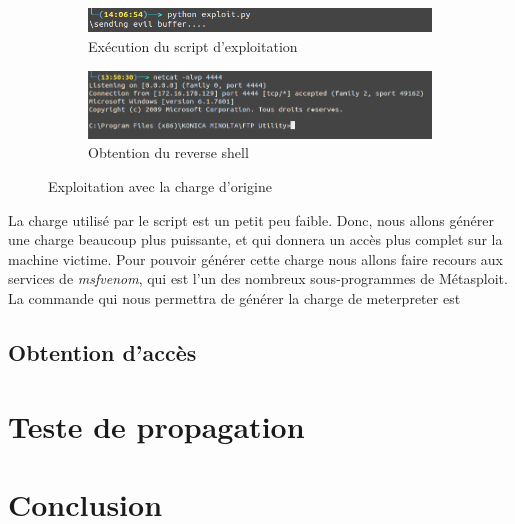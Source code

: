     \begin{figure}[h!]
        \centering
        \begin{subfigure}{0.9\textwidth}
            \centering
            \includegraphics[width=\textwidth]{images/exploit_python.png}
            \caption{Exécution du script d'exploitation}
            \label{execution_script_exploitation}
        \end{subfigure}
        \hfill
        \begin{subfigure}{0.9\textwidth}
            \centering
            \includegraphics[width=\textwidth]{images/reverse_shell.png}
            \caption{Obtention du reverse shell}
            \label{obtention_reverse_shell}
        \end{subfigure}
        \hfill
        \caption{Exploitation avec la charge d'origine}
        \label{exploitation_avec_charge_origine}
    \end{figure}


    La charge utilisé par le script est un petit peu faible. Donc, nous allons générer une charge beaucoup plus
    puissante, et qui donnera un accès plus complet sur la machine victime. Pour pouvoir générer cette charge nous
    allons faire recours aux services de \emph{msfvenom}, qui est l'un des nombreux sous-programmes de Métasploit.
    La commande qui nous permettra de générer la charge de meterpreter est 

    \subsection{Obtention d'accès}
\section{Teste de propagation}

\section{Conclusion}
